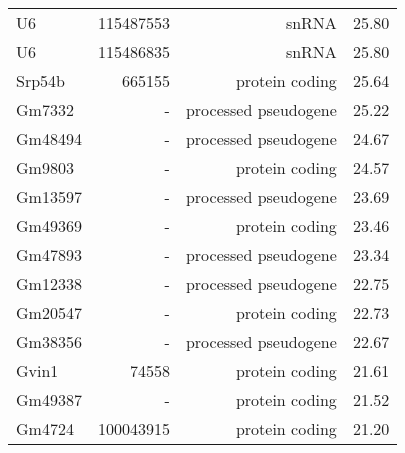 \begin{longtable}[t]{lrrr}
\addlinespace
U6 & 115487553 & snRNA & 25.80\\
U6 & 115486835 & snRNA & 25.80\\
Srp54b & 665155 & protein coding & 25.64\\
Gm7332 & - & processed pseudogene & 25.22\\
Gm48494 & - & processed pseudogene & 24.67\\
\addlinespace
Gm9803 & - & protein coding & 24.57\\
Gm13597 & - & processed pseudogene & 23.69\\
Gm49369 & - & protein coding & 23.46\\
Gm47893 & - & processed pseudogene & 23.34\\
Gm12338 & - & processed pseudogene & 22.75\\
\addlinespace
Gm20547 & - & protein coding & 22.73\\
Gm38356 & - & processed pseudogene & 22.67\\
Gvin1 & 74558 & protein coding & 21.61\\
Gm49387 & - & protein coding & 21.52\\
Gm4724 & 100043915 & protein coding & 21.20\\
\bottomrule
\end{longtable}
\endgroup{}

